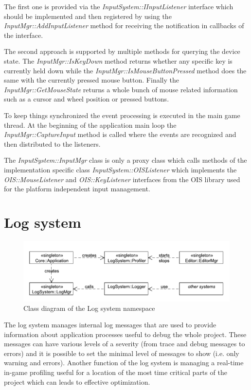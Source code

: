 \documentclass[a4paper, 12pt]{report}
\begin{document}
The first one is provided via the \emph{InputSystem::IInputListener} interface which should be implemented and then registered by using the \emph{InputMgr::\-AddInputListener} method for receiving the notification in callbacks of the interface.

The second approach is supported by multiple methods for querying the device state. The \emph{InputMgr::IsKeyDown} method returns whether any specific key is currently held down while the \emph{InputMgr::IsMouseButtonPressed} method does the same with the currently pressed mouse button. Finally the \emph{InputMgr::GetMouseState} returns a whole bunch of mouse related information such as a cursor and wheel position or pressed buttons.

To keep things synchronized the event processing is executed in the main game thread. At the beginning of the application main loop the \emph{InputMgr::CaptureInput} method is called where the events are recognized and then distributed to the listeners.

The \emph{InputSystem::InputMgr} class is only a proxy class which calls methods of the implementation specific class \emph{InputSystem::OISListener} which implements the \emph{OIS::MouseListener} and \emph{OIS::KeyListener} interfaces from the OIS library used for the platform independent input management.


\chapter{Log system}

\begin{figure}[htbp]
	\centering
		\includegraphics[width=1\textwidth]{LogSystemClassDiagram.pdf}
	\caption{Class diagram of the Log system namespace}
	\label{fig:logsystem-diagram}
\end{figure}

The log system manages internal log messages that are used to provide information about application processes useful to debug the whole project. These messages can have various levels of a severity (from trace and debug messages to errors) and it is possible to set the minimal level of messages to show (i.e. only warning and errors). Another function of the log system is managing a real-time in-game profiling useful for a location of the most time critical parts of the project which can leads to effective optimization.
\end{document}

